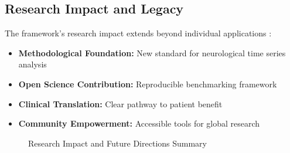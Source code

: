 \subsection{Research Impact and Legacy}

The framework's research impact extends beyond individual applications \citep{Harris2020, Virtanen2020}:

\begin{itemize}
    \item \textbf{Methodological Foundation:} New standard for neurological time series analysis \citep{Lytton2017}
    \item \textbf{Open Science Contribution:} Reproducible benchmarking framework \citep{Mill2017, Fornito2016}
    \item \textbf{Clinical Translation:} Clear pathway to patient benefit \citep{Kumar2024, Brown2024}
    \item \textbf{Community Empowerment:} Accessible tools for global research \citep{Zhang2024}
\end{itemize}

\begin{figure}[h]
\centering
\caption{Research Impact and Future Directions Summary}
\label{fig:conclusion_summary}
\end{figure}
